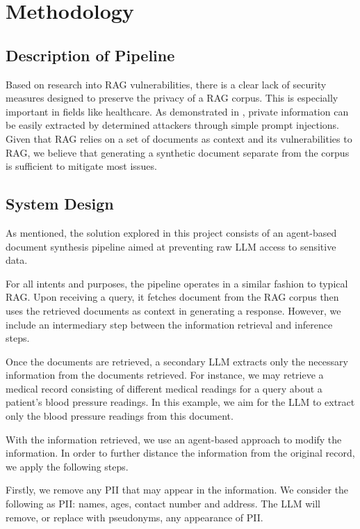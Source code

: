 \chapter{Methodology}
\section{Description of Pipeline}
Based on research into RAG vulnerabilities, there is a clear lack of security measures designed to preserve the privacy of a RAG corpus. This is especially important in fields like healthcare.
As demonstrated in \autocite{zeng2024goodbadexploringprivacy}, private information can be easily extracted by determined attackers through simple prompt injections.
Given that RAG relies on a set of documents as context and its vulnerabilities to RAG, we believe that generating a synthetic document separate from the corpus is sufficient to mitigate most issues.

\section{System Design}
As mentioned, the solution explored in this project consists of an agent-based document synthesis pipeline aimed at preventing raw LLM access to sensitive data.

For all intents and purposes, the pipeline operates in a similar fashion to typical RAG. Upon receiving a query, it fetches document from the RAG corpus then uses the retrieved documents as context in generating a response. However, we include an intermediary step between the information retrieval and inference steps.

Once the documents are retrieved, a  secondary LLM extracts only the necessary information from the documents retrieved. For instance, we may retrieve a medical record consisting of different medical readings for a query about a patient's blood pressure readings. In this example, we aim for the LLM to extract only the blood pressure readings from this document.

With the information retrieved, we use an agent-based approach to modify the information. In order to further distance the information from the original record, we apply the following steps.

Firstly, we remove any PII that may appear in the information. We consider the following as PII: names, ages, contact number and address. The LLM will remove, or replace with pseudonyms, any appearance of PII.

